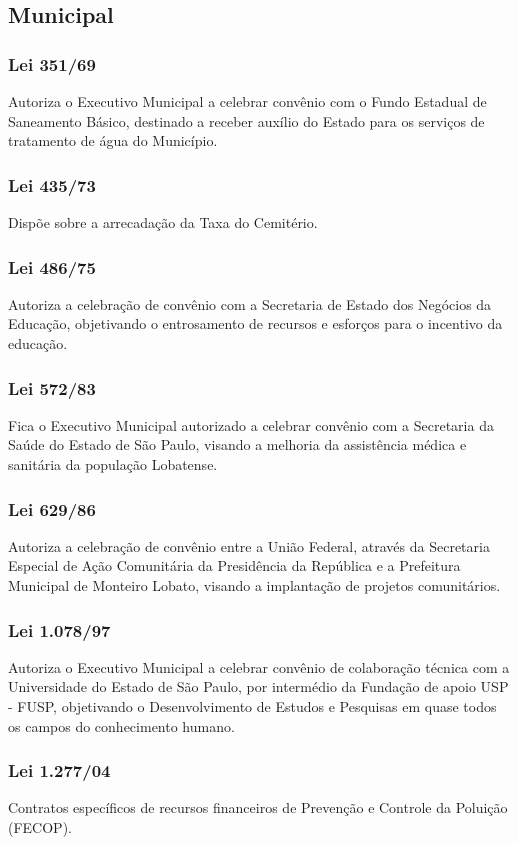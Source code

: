  \begin{subapend}
 	 \subsection{Municipal}
 	\begin{subsubapend}
 		\item \subsubsection{Lei 351/69}
 		Autoriza o Executivo Municipal a celebrar convênio com o Fundo Estadual de Saneamento Básico, destinado a receber auxílio do Estado para os serviços de tratamento de água do Município.
 		\subsubsection{Lei 435/73}
 		Dispõe sobre a arrecadação da Taxa do Cemitério.
 		\subsubsection{Lei 486/75}
 		Autoriza a celebração de convênio com a Secretaria de Estado dos Negócios da Educação, objetivando o entrosamento de recursos e esforços para o incentivo da educação.
 		\subsubsection{Lei 572/83}
 		Fica o Executivo Municipal autorizado a celebrar convênio com a Secretaria da Saúde do Estado de São Paulo, visando a melhoria da assistência médica e sanitária da população Lobatense.
 		\subsubsection{Lei 629/86}
 		Autoriza a celebração de convênio entre a União Federal, através da Secretaria Especial de Ação Comunitária da Presidência da República e a Prefeitura Municipal de Monteiro Lobato, visando a implantação de projetos comunitários.
 		\subsubsection{Lei 1.078/97}
 		Autoriza o Executivo Municipal a celebrar convênio de colaboração técnica com a Universidade do Estado de São Paulo, por intermédio da Fundação de apoio USP - FUSP, objetivando o Desenvolvimento de Estudos e Pesquisas em quase todos os campos do conhecimento humano.
 		\subsubsection{Lei 1.277/04}
 		Contratos específicos de recursos financeiros de Prevenção e Controle da Poluição (FECOP).

\end{subsubapend}
\end{subapend}
